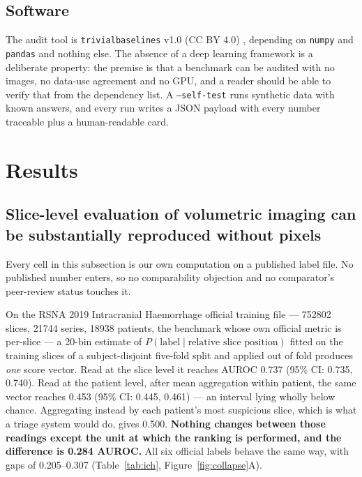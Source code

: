 \documentclass[11pt,a4paper]{article}
\begin{document}
\subsection{Software}

The audit tool is \texttt{trivialbaselines} v1.0 (CC BY 4.0)
\citep{trivialbaselines2026}, depending on
\texttt{numpy} and \texttt{pandas} and nothing else. The absence of a deep
learning framework is a deliberate property: the premise is that a benchmark can
be audited with no images, no data-use agreement and no GPU, and a reader should
be able to verify that from the dependency list. A \texttt{--self-test} runs
synthetic data with known answers, and every run writes a JSON payload with every
number traceable plus a human-readable card.

\section{Results}

\subsection{Slice-level evaluation of volumetric imaging can be substantially
reproduced without pixels}

Every cell in this subsection is our own computation on a published label file.
No published number enters, so no comparability objection and no comparator's
peer-review status touches it.

On the RSNA 2019 Intracranial Haemorrhage official training file ---
\num{752802} slices, \num{21744} series, \num{18938} patients, the benchmark
whose own official metric is per-slice --- a 20-bin estimate of
$P(\text{label}\mid\text{relative slice position})$ fitted on the training slices
of a subject-disjoint five-fold split and applied out of fold produces
\emph{one} score vector. Read at the slice level it reaches AUROC 0.737 (95\% CI:
0.735, 0.740). Read at the patient level, after mean aggregation within patient,
the same vector reaches 0.453 (95\% CI: 0.445, 0.461) --- an interval lying
wholly below chance. Aggregating instead by each patient's most suspicious slice,
which is what a triage system would do, gives 0.500. \textbf{Nothing changes
between those readings except the unit at which the ranking is performed, and the
difference is 0.284 AUROC.} All six official labels behave the same way, with
gaps of 0.205--0.307 (Table~\ref{tab:ich}, Figure~\ref{fig:collapse}A).
\end{document}
